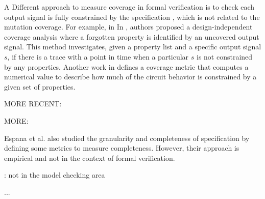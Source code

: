 A Different approach to measure coverage in formal verification is to check each output signal is fully constrained by the specification \cite{das2005formal, claessen2007coverage, grosse2007estimating}, which is not related to the mutation coverage. For example, in In \cite{claessen2007coverage}, authors proposed a design-independent coverage analysis where a forgotten property is identified by an uncovered output signal. This method investigates, given a property list and a specific output signal $s$, if there is a trace with a point in time when a particular $s$ is not constrained by any properties. Another work in \cite{haedicke2012guiding} defines a coverage metric that computes a numerical value to describe how much of the circuit behavior is constrained by a given set of properties.

MORE RECENT: \cite{yang2013minimal} \cite{chockler2011incremental} \cite{brillout2009mutation} \cite{bao2014coverage}

MORE:

Espana et al. \cite{espana2009evaluating} also studied the granularity and completeness of specification by defining some metrics to measure completeness. However, their approach is empirical and not in the context of formal verification.

\cite{drechsler2012completeness, firesmith2005your, chang2007finding,katta2013investigating, zowghi2002three} : not in the model checking area

\cite{Whalen07:FMICS} ...
